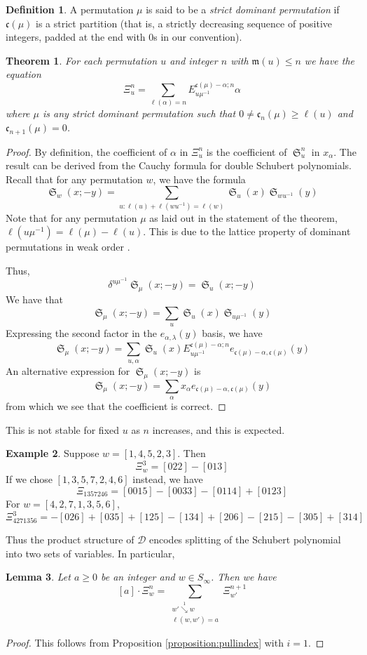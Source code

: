 \documentclass{amsart}
\newtheorem{lemma}{Lemma}[subsection]
\newtheorem{theorem}{Theorem}[section]
\theoremstyle{definition}
\newtheorem{definition}[lemma]{Definition}
\newtheorem{example}[lemma]{Example}
\theoremstyle{remark}
\numberwithin{equation}{subsection}
\DeclareMathOperator{\sch}{\mathfrak{S}}
\newcommand{\downvar}[1]{\stackrel{#1}{\searrow}}
\newcommand{\dsch}{\ensuremath{\Xi}}
\newcommand{\dcoma}{\mathcal{D}}
\newcommand{\code}{\mathfrak{c}}
\newcommand{\maxd}{\mathfrak{m}}
\begin{document}
\begin{definition}
A permutation $\mu$ is said to be a \emph{strict dominant permutation} if $\code(\mu)$ is a strict partition (that is, a strictly decreasing sequence of positive integers, padded at the end with $0$s in our convention).
\end{definition}

\begin{theorem}
	For each permutation $u$ and integer $n$ with $\maxd(u)\leq n$ we have the equation
	$$\dsch_u^{n} = \sum_{\ell(\alpha)=n} E^{\code(\mu)-\alpha;n}_{u\mu^{-1}}\alpha$$
	where $\mu$ is any strict dominant permutation such that $0\neq \code_n(\mu) \geq \ell(u)$ and $\code_{n+1}(\mu)=0$.
\end{theorem}
\begin{proof}
	By definition, the coefficient of $\alpha$ in $\dsch_u^n$ is the coefficient of $\sch_u^n$ in $x_\alpha$. The result can be derived from the Cauchy formula for double Schubert polynomials. Recall that for any permutation $w$, we have the formula
  $$\sch_w(x;-y) = \sum_{u:\ell(u)+\ell(wu^{-1})=\ell(w)} \sch_u(x)\sch_{wu^{-1}}(y)$$
  Note that for any permutation $\mu$ as laid out in the statement of the theorem, $\ell(u\mu^{-1})=\ell(\mu)-\ell(u)$. This is due to the lattice property of dominant permutations in weak order \cite{bjorner1997shellable}.

  Thus,
	$$\delta^{u\mu^{-1}}\sch_\mu(x;-y) = \sch_u(x;-y)$$
	We have that
	$$\sch_\mu(x;-y)=\sum_u \sch_u(x)\sch_{u\mu^{-1}}(y)$$
	Expressing the second factor in the $e_{\alpha,\lambda}(y)$ basis, we have
	$$\sch_\mu(x;-y)=\sum_{u,\alpha} \sch_u(x)E_{u\mu^{-1}}^{\code(\mu)-\alpha;n}e_{\code(\mu)-\alpha,\code(\mu)}(y)$$
	An alternative expression for $\sch_\mu(x;-y)$ is
	$$\sch_\mu(x;-y)=\sum_{\alpha} x_\alpha e_{\code(\mu)-\alpha,\code(\mu)}(y)$$
	from which we see that the coefficient is correct.
\end{proof}


This is not stable for fixed $u$ as $n$ increases, and this is expected.


\begin{example}
Suppose $w = [1,4,5,2,3]$. Then
$$\dsch_w^3 = [022] - [013]$$
If we chose $[1,3,5,7,2,4,6]$ instead, we have
$$\dsch_{1357246} = [0015] - [0033] - [0114] + [0123]$$
For $w=[4,2,7,1,3,5,6]$,
$$\dsch_{4271356}^3 = -[026] + [035] + [125] - [134] + [206] - [215] - [305] + [314]$$
\end{example}

Thus the product structure of $\dcoma$ encodes splitting of the Schubert polynomial into two sets of variables. In particular,
\begin{lemma} \label{lemma:dpieri}
Let $a\geq 0$ be an integer and $w\in S_\infty$. Then we have
$$[a]\cdot \dsch_{w}^{n} = \sum_{\substack{w'\downvar{1} w\\ \ell(w,w')=a}} \dsch_{w'}^{n+1}$$
\end{lemma}
\begin{proof}
  This follows from Proposition \ref{proposition:pullindex} with $i=1$.
\end{proof}
\end{document}
